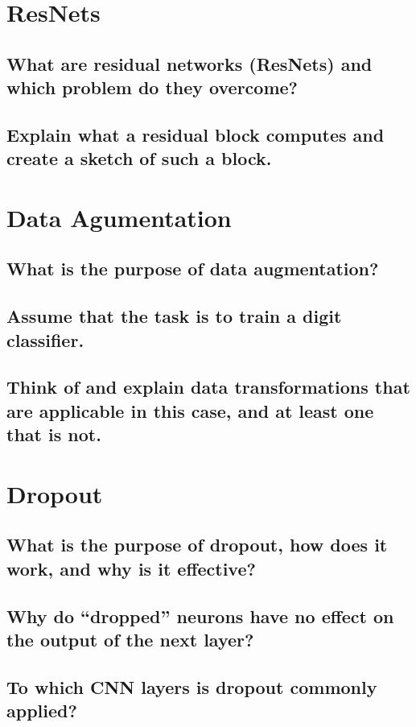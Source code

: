 \section{ResNets}
\subsection{What are residual networks (ResNets) and which problem do they overcome?}
\subsection{Explain what a residual block computes and create a sketch of such a block.}



\section{Data Agumentation}
\subsection{What is the purpose of data augmentation?}
\subsection{Assume that the task is to train a digit classifier.}
\subsection{Think of and explain data transformations that are applicable in this case, and at least one that is not.}

\section{Dropout}
\subsection{What is the purpose of dropout, how does it work, and why is it effective?}
\subsection{Why do “dropped” neurons have no effect on the output of the next layer?}
\subsection{To which CNN layers is dropout commonly applied?}

